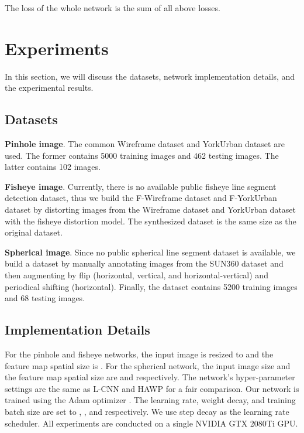 \documentclass[letterpaper, 10 pt, conference]{ieeeconf}
\begin{document}
The loss of the whole network is the sum of all above losses.


\section{Experiments} \label{sec4} 
In this section, we will discuss the datasets, network implementation details, and the experimental results. 

\subsection{Datasets} \label{sec4-1} 
\noindent \textbf{Pinhole image}. The common Wireframe dataset \cite{DWP} and YorkUrban dataset \cite{YorkUrban} are used. The former contains 5000 training images and 462 testing images. The latter contains 102 images. 

\noindent \textbf{Fisheye image}. Currently, there is no available public fisheye line segment detection dataset, thus we build the F-Wireframe dataset and F-YorkUrban dataset by distorting images from the Wireframe dataset and YorkUrban dataset with the fisheye distortion model. The synthesized dataset is the same size as the original dataset. 

\noindent \textbf{Spherical image}. Since no public spherical line segment dataset is available, we build a dataset by manually annotating images from the SUN360 dataset \cite{SUN360} and then augmenting by flip (horizontal, vertical, and horizontal-vertical) and periodical shifting (horizontal). Finally, the dataset contains 5200 training images and 68 testing images.

\subsection{Implementation Details} \label{sec4-2} 
For the pinhole and fisheye networks, the input image is resized to  and the feature map spatial size is . For the spherical network, the input image size and the feature map spatial size are  and  respectively. The network's hyper-parameter settings are the same as L-CNN and HAWP for a fair comparison. Our network is trained using the Adam optimizer \cite{Adam}. The learning rate, weight decay, and training batch size are set to , , and  respectively. We use step decay as the learning rate scheduler. All experiments are conducted on a single NVIDIA GTX 2080Ti GPU.
\end{document}
